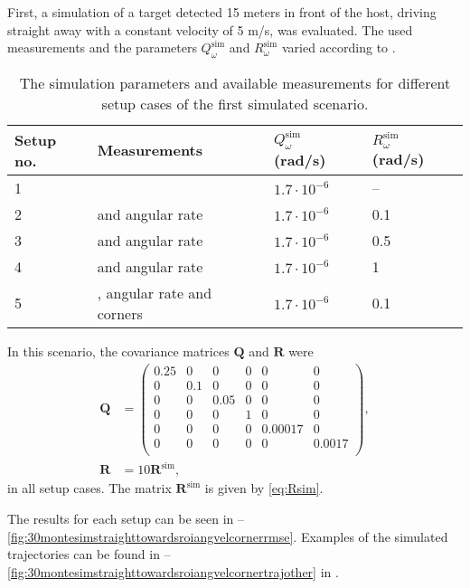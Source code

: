 First, a simulation of a target detected 15 meters in front of the host, driving straight away with a constant velocity of 5 m/s, was evaluated.
The used measurements and the parameters $Q^\text{sim}_\omega$ and $R^\text{sim}_\omega$ varied according to .
%
\begin{table}[!ht]
	\centering
	\caption{\label{tab:montesimscenario1} The simulation parameters and available measurements for different setup cases of the first simulated scenario.}
	\renewcommand{\arraystretch}{1.2}
	\begin{tabular}{|l|p{3.5cm}|l|l|}
		\hline
		\textbf{Setup no.} & \textbf{Measurements} & $Q^\text{sim}_\omega$ (rad/s) & $R^\text{sim}_\omega$ (rad/s) \\
		\hline
		1 & \abbrROI & $1.7\cdot 10^{-6}$ & -- \\
		\hline
		2 & \abbrROI and angular rate & $1.7\cdot 10^{-6}$ & 0.1 \\
		\hline
		3 & \abbrROI and angular rate & $1.7\cdot 10^{-6}$ & 0.5 \\
		\hline
		4 & \abbrROI and angular rate & $1.7\cdot 10^{-6}$ & 1 \\
		\hline
		5 & \abbrROI, angular rate and corners & $1.7\cdot 10^{-6}$ & 0.1 \\
		\hline
	\end{tabular}
\end{table}

In this scenario, the covariance matrices $\bm{Q}$ and $\bm{R}$ were
\begin{align}
	\label{eq:Qsim1}
	\bm{Q} &=
	\begin{pmatrix}
		0.25 & 0 & 0 & 0 & 0 & 0 \\
		0 & 0.1 & 0 & 0 & 0 & 0 \\
		0 & 0 & 0.05 & 0 & 0 & 0 \\
		0 & 0 & 0 & 1 & 0 & 0 \\
		0 & 0 & 0 & 0 & 0.00017 & 0 \\
		0 & 0 & 0 & 0 & 0 & 0.0017 \\
	\end{pmatrix}, \\
	\label{eq:Rsim1}
	\bm{R} &= 10 \bm{R}^\text{sim},
\end{align}
in all setup cases.
The matrix $\bm{R}^\text{sim}$ is given by \eqref{eq:Rsim}.

The results for each setup can be seen in --\ref{fig:30montesimstraighttowardsroiangvelcornerrmse}.
Examples of the simulated trajectories can be found in --\ref{fig:30montesimstraighttowardsroiangvelcornertrajother} in .

